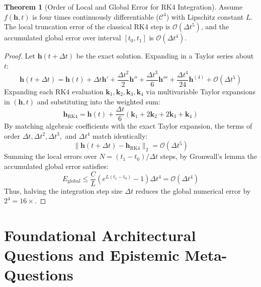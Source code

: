 \documentclass[11pt,a4paper]{article}
\theoremstyle{definition}
\newtheorem{theorem}{\textbf{Theorem}}[section]
\begin{document}
\begin{theorem}[Order of Local and Global Error for RK4 Integration]
Assume $f(\mathbf{h}, t)$ is four times continuously differentiable ($\mathcal{C}^4$) with Lipschitz constant $L$. The local truncation error of the classical RK4 step is $\mathcal{O}(\Delta t^5)$, and the accumulated global error over interval $[t_0, t_1]$ is $\mathcal{O}(\Delta t^4)$.
\end{theorem}

\begin{proof}
Let $\mathbf{h}(t + \Delta t)$ be the exact solution. Expanding in a Taylor series about $t$:
{\boldmath
\begin{equation}
\mathbf{h}(t + \Delta t) = \mathbf{h}(t) + \Delta t \mathbf{h}' + \frac{\Delta t^2}{2} \mathbf{h}'' + \frac{\Delta t^3}{6} \mathbf{h}''' + \frac{\Delta t^4}{24} \mathbf{h}^{(4)} + \mathcal{O}(\Delta t^5)
\end{equation}
}
Expanding each RK4 evaluation $\mathbf{k}_1, \mathbf{k}_2, \mathbf{k}_3, \mathbf{k}_4$ via multivariable Taylor expansions in $(\mathbf{h}, t)$ and substituting into the weighted sum:
{\boldmath
\begin{equation}
\mathbf{h}_{\text{RK4}} = \mathbf{h}(t) + \frac{\Delta t}{6}(\mathbf{k}_1 + 2\mathbf{k}_2 + 2\mathbf{k}_3 + \mathbf{k}_4)
\end{equation}
}
By matching algebraic coefficients with the exact Taylor expansion, the terms of order $\Delta t, \Delta t^2, \Delta t^3,$ and $\Delta t^4$ match identically:
{\boldmath
\begin{equation}
\|\mathbf{h}(t + \Delta t) - \mathbf{h}_{\text{RK4}}\|_2 = \mathcal{O}(\Delta t^5)
\end{equation}
}
Summing the local errors over $N = (t_1 - t_0)/\Delta t$ steps, by Gronwall's lemma the accumulated global error satisfies:
{\boldmath
\begin{equation}
E_{\text{global}} \le \frac{C}{L} (e^{L(t_1 - t_0)} - 1) \Delta t^4 = \mathcal{O}(\Delta t^4)
\end{equation}
}
Thus, halving the integration step size $\Delta t$ reduces the global numerical error by $2^4 = 16\times$.
\end{proof}

\section{Foundational Architectural Questions and Epistemic Meta-Questions}
\end{document}
